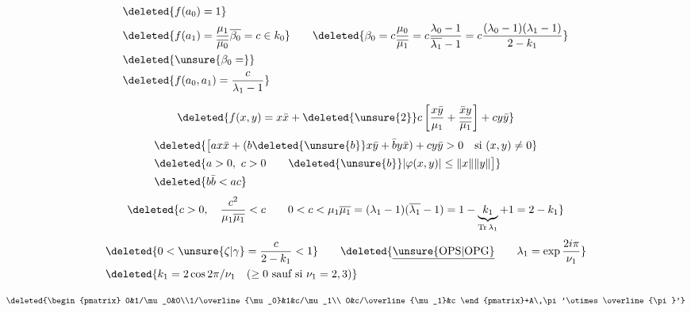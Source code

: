 \[
\begin{aligned}
&\deleted{f(a_0)=1}\\
&\deleted{f(a_1)=\frac{\mu_1}{\overline{\mu_0}}\overline{\beta_0}=c\in k_0}
\qquad\deleted{\beta_0=c\frac{\mu_0}{\overline{\mu_1}}=
c\frac{\lambda_0-1}{\overline{\lambda_1}-1}
=c\frac{(\lambda_0-1)(\lambda_1-1)}{2-k_1}}\\
&\deleted{\unsure{\beta_0=}}\\
&\deleted{f(a_0,a_1)=\frac c{\lambda_1-1}}
\end{aligned}
\]

\[
\deleted{f(x,y)=x\bar x+\deleted{\unsure{2}}c\left[\frac{x\bar y}{\mu_1}+
\frac{\bar x y}{\overline{\mu_1}}\right]+cy\bar y}
\]
\[
\begin{aligned}
&\deleted{\big[ax\bar x+(b\deleted{\unsure{b}}x\bar y+\bar b y\bar x)+cy\bar y>0\quad\text{si }(x,y)\ne0}\\
&\deleted{a>0,\ c>0\qquad \deleted{\unsure{b}}\lvert\varphi(x,y)\rvert\leq\|x\|\|y\|\big]}\\
&\deleted{b\bar b<ac}
\end{aligned}
\]
\[
\deleted{c>0,\quad\frac{c^2}{\mu_1\overline{\mu_1}}<c\qquad
0<c<\mu_1\overline{\mu_1}=(\lambda_1-1)(\overline{\lambda_1}-1)
=1-\underbrace{k_1}_{\operatorname{Tr}\lambda_1}+1=2-k_1}
\]
\[
\begin{aligned}
&\deleted{0<\unsure{\zeta|\gamma}=\frac c{2-k_1}<1}\qquad
\deleted{\underline{\text{\unsure{OPS|OPG}}}\qquad\lambda_1=\exp\frac{2i\pi}{\nu_1}}\\
&\deleted{k_1=2\cos 2\pi/\nu_1\quad(\geq0\text{ sauf si }\nu_1=2,3)}
\end{aligned}
\]

\qquad {}
\[
\deleted{\begin{pmatrix}
0&1/\mu_0&0\\1/\overline{\mu_0}&1&c/\mu_1\\
0&c/\overline{\mu_1}&c
\end{pmatrix}+A\,\pi'\otimes\overline{\pi}'}
\]

